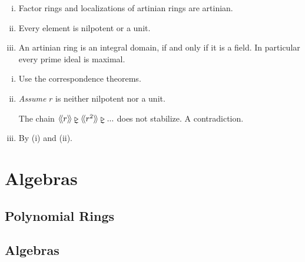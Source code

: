 	\begin{lemma}\vspace{-1.5em}
		\begin{enumerate}[(i)]
			\item{
				Factor rings and localizations of artinian rings are artinian.
			}
			\item{
				Every element is nilpotent or a unit.
			}
			\item{
				An artinian ring is an integral domain, if and only if it is a field. In particular every prime ideal is maximal.
			}
		\end{enumerate}
	\end{lemma}
	\begin{sketch}
		\begin{enumerate}[(i)]
			\item{
				Use the correspondence theorems.
			}
			\item{
				\textit{Assume} $r$ is neither nilpotent nor a unit.
				\begin{tab}[1.3cm]
					The chain $\Gen{r} \vidneq \Gen{r^2} \vidneq ...$ does not stabilize. A contradiction.
				\end{tab}
			}
			\item{
				By (i) and (ii).
			}\vspace{-1.8em}
		\end{enumerate}
	\end{sketch}


	\newpage
	\section{Algebras}
	\subsection{Polynomial Rings}
	\subsection{Algebras}

